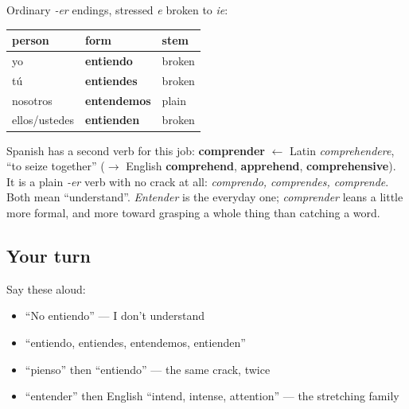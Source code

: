 \begin{grammarlens}[title={Grammar Lens: an -er verb that cracks, and a calmer twin}]
Ordinary \emph{-er} endings, stressed \emph{e} broken to \emph{ie}:

\noindent
\begin{tabularx}{\linewidth}{@{}>{\raggedright\arraybackslash}X>{\raggedright\arraybackslash}X>{\raggedright\arraybackslash}X@{}}
\toprule
\textbf{person} & \textbf{form} & \textbf{stem} \\
\midrule
yo & \textbf{entiendo} & broken \\
tú & \textbf{entiendes} & broken \\
nosotros & \textbf{entendemos} & plain \\
ellos/ustedes & \textbf{entienden} & broken \\
\bottomrule
\end{tabularx}

Spanish has a second verb for this job: \textbf{comprender} $\leftarrow$ Latin \emph{comprehendere}, \textquotedblleft{}to seize together\textquotedblright{} ($\to$ English \textbf{comprehend}, \textbf{apprehend}, \textbf{comprehensive}). It is a plain \emph{-er} verb with no crack at all: \emph{comprendo, comprendes, comprende}. Both mean \textquotedblleft{}understand\textquotedblright{}. \emph{Entender} is the everyday one; \emph{comprender} leans a little more formal, and more toward grasping a whole thing than catching a word.
\end{grammarlens}

\subsection*{Your turn}
Say these aloud:

\begin{itemize}
\raggedright
  \item \textquotedblleft{}No entiendo\textquotedblright{} — I don't understand
  \item \textquotedblleft{}entiendo, entiendes, entendemos, entienden\textquotedblright{}
  \item \textquotedblleft{}pienso\textquotedblright{} then \textquotedblleft{}entiendo\textquotedblright{} — the same crack, twice
  \item \textquotedblleft{}entender\textquotedblright{} then English \textquotedblleft{}intend, intense, attention\textquotedblright{} — the stretching family
\end{itemize}

